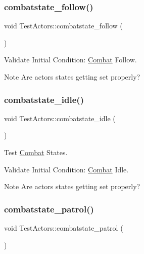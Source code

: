 \subsubsection{\texorpdfstring{combatstate\+\_\+follow()}{combatstate\_follow()}}
{\footnotesize\ttfamily void Test\+Actors\+::combatstate\+\_\+follow (\begin{DoxyParamCaption}{ }\end{DoxyParamCaption})}



Validate Initial Condition\+: \mbox{\hyperlink{classCombat}{Combat}} Follow. 

\begin{DoxyNote}{Note}
Are actors states getting set properly? 
\end{DoxyNote}
\mbox{\label{classTestActors_ad91ee71834205bddf98130928c7477db}} 
\subsubsection{\texorpdfstring{combatstate\+\_\+idle()}{combatstate\_idle()}}
{\footnotesize\ttfamily void Test\+Actors\+::combatstate\+\_\+idle (\begin{DoxyParamCaption}{ }\end{DoxyParamCaption})}



Test \mbox{\hyperlink{classCombat}{Combat}} States. 

Validate Initial Condition\+: \mbox{\hyperlink{classCombat}{Combat}} Idle.

\begin{DoxyNote}{Note}
Are actors states getting set properly? 
\end{DoxyNote}
\mbox{\label{classTestActors_adea89af1b49b9625309097e06bf30cee}} 
\subsubsection{\texorpdfstring{combatstate\+\_\+patrol()}{combatstate\_patrol()}}
{\footnotesize\ttfamily void Test\+Actors\+::combatstate\+\_\+patrol (\begin{DoxyParamCaption}{ }\end{DoxyParamCaption})}



